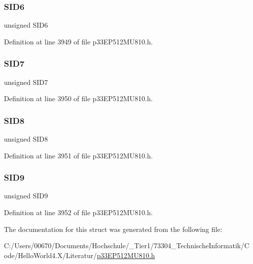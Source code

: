 \subsubsection{\texorpdfstring{S\+I\+D6}{SID6}}
{\footnotesize\ttfamily unsigned S\+I\+D6}



Definition at line 3949 of file p33\+E\+P512\+M\+U810.\+h.

\mbox{\label{structtag_c1_r_x_f4_s_i_d_b_i_t_s_a34097fb76decd431701fa2d86a22328e}} 
\subsubsection{\texorpdfstring{S\+I\+D7}{SID7}}
{\footnotesize\ttfamily unsigned S\+I\+D7}



Definition at line 3950 of file p33\+E\+P512\+M\+U810.\+h.

\mbox{\label{structtag_c1_r_x_f4_s_i_d_b_i_t_s_afe74894633244fdb0b0c01b4e8c522e7}} 
\subsubsection{\texorpdfstring{S\+I\+D8}{SID8}}
{\footnotesize\ttfamily unsigned S\+I\+D8}



Definition at line 3951 of file p33\+E\+P512\+M\+U810.\+h.

\mbox{\label{structtag_c1_r_x_f4_s_i_d_b_i_t_s_a33587704948067005c2a6a3ccc503c99}} 
\subsubsection{\texorpdfstring{S\+I\+D9}{SID9}}
{\footnotesize\ttfamily unsigned S\+I\+D9}



Definition at line 3952 of file p33\+E\+P512\+M\+U810.\+h.



The documentation for this struct was generated from the following file\+:\begin{DoxyCompactItemize}
\item 
C\+:/\+Users/00670/\+Documents/\+Hochschule/\+\_\+\+Tier1/73304\+\_\+\+Technische\+Informatik/\+Code/\+Hello\+World4.\+X/\+Literatur/\hyperlink{p33_e_p512_m_u810_8h}{p33\+E\+P512\+M\+U810.\+h}\end{DoxyCompactItemize}
